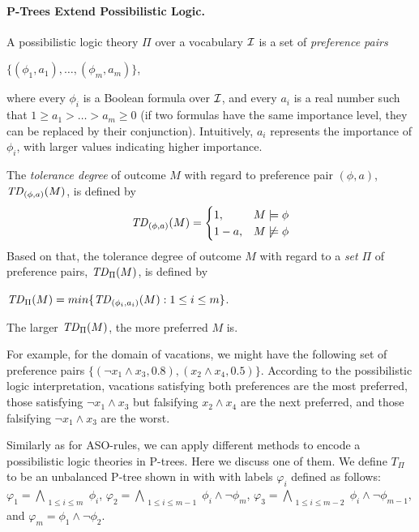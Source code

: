 \paragraph{\bf P-Trees Extend Possibilistic Logic.}


A possibilistic logic theory $\Pi$ over a vocabulary $\mathcal{I}$ is a set of 
\emph{preference pairs}
\begin{center}
	$\{ (\phi_1,a_1), \ldots, (\phi_m,a_m) \}$,
\end{center}
where every $\phi_i$ is a Boolean formula over $\mathcal{I}$, and every $a_i$ is a real number
such that $1\geq a_1>\ldots>a_m\geq 0$ (if two formulas have the same 
importance level, they can be replaced by their conjunction).
Intuitively, $a_i$ represents the importance of $\phi_i$, with larger values
indicating higher importance.

The \textit{tolerance degree} of outcome $M$ with regard to preference 
pair $(\phi,a)$, $\mathit{TD}_{(\phi,a)}(M)$, is defined by
\[
 \mathit{TD}_{(\phi,a)}(M) =
  \begin{cases}
   1, & M \models \phi \\
   1-a, & M \not \models \phi
  \end{cases}
\]
Based on that, the tolerance degree of outcome $M$ with regard to a \emph{set}
$\Pi$ of preference pairs, $\mathit{TD}_\Pi(M)$, is defined by 
\begin{center}
	$\mathit{TD}_\Pi(M)=min\{\mathit{TD}_{(\phi_i,a_i)}(M):1\leq i \leq m\}$.
\end{center}
The larger $\mathit{TD}_\Pi(M)$, the more preferred $M$ is.

For example, for the domain of vacations, we might have the following
set of preference pairs $\{(\neg x_1 \wedge x_3,0.8), (x_2 \wedge x_4,0.5)\}$.
According to the possibilistic logic interpretation, vacations satisfying 
both preferences are the most preferred, those satisfying $\neg x_1 \wedge x_3$ 
but falsifying $x_2 \wedge x_4$ are the next
preferred, and those falsifying $\neg x_1 \wedge x_3$ are the worst.

Similarly as for ASO-rules, we can apply different methods to encode 
a possibilistic logic theories in P-trees. Here we discuss one of them.
We define $T_\Pi$ to be an unbalanced P-tree shown in  with with 
labels $\varphi_i$ defined as follows: 
$\varphi_1=\bigwedge_{\substack{1\leq i \leq m}} \phi_i$, 
$\varphi_2=\bigwedge_{\substack{1\leq i \leq m-1}} \phi_i \wedge \neg \phi_m$,
$\varphi_3=\bigwedge_{\substack{1\leq i \leq m-2}} \phi_i \wedge \neg \phi_{m-1}$, and
$\varphi_m = \phi_1 \wedge \neg \phi_2$.

